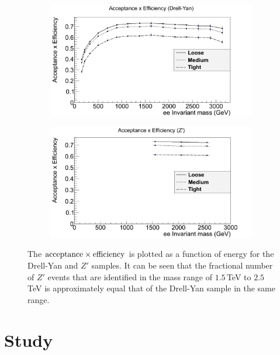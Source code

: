 \documentclass{article}
\begin{document}
\begin{figure}[htb]
	\centering
    \begin{subfigure}{.49\textwidth}
    	\raggedleft
        \includegraphics[width=1.13\textwidth]{images/acceptanceDY.png}
        \caption{}
        \label{fig:acceptanceDY}
    \end{subfigure}
    \begin{subfigure}{.49\textwidth}
    	\raggedright
        \includegraphics[width=1.13\textwidth]{images/acceptanceZ.png}
        \caption{}
        \label{fig:acceptanceZ}
    \end{subfigure}    	
    \caption{ The $\rm{acceptance}\times\rm{efficiency}$ is plotted as a function of energy for the Drell-Yan and $Z'$ samples. It can be seen that the fractional number of $Z'$ events that are identified in the mass range of $1.5\,$TeV to $2.5\,$TeV is approximately equal that of the Drell-Yan sample in the same range. \label{fig:acceptance}}
\end{figure}

\section{Study}
\label{sec:Study}
\end{document}
